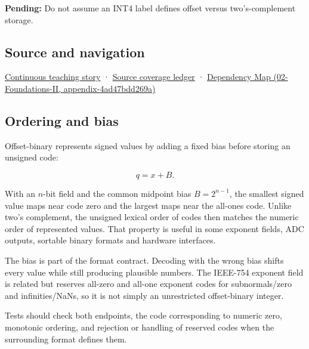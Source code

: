 \textbf{Pending:} Do not assume an INT4 label defines offset versus two's-complement storage.

\subsection{Source and navigation}\label{appendix-53a8cfb25f8d-source-and-navigation}

\hyperref[01-foundations-i-ch001-choosing-what-information-to-keep]{Continuous teaching story} · \hyperref[appendix-fd090d982a15]{Source coverage ledger} · \href{../02-Foundations-II/main.pdf\#nameddest=appendix-4ad47bdd269a}{Dependency Map (02-Foundations-II, appendix-4ad47bdd269a)}

\subsection{Ordering and bias}\label{appendix-53a8cfb25f8d-ordering-and-bias}

Offset-binary represents signed values by adding a fixed bias before storing an unsigned code:

\[q=x+B.\]

With an \(n\)-bit field and the common midpoint bias \(B=2^{n-1}\), the smallest signed value maps near code zero and the largest maps near the all-ones code. Unlike two's complement, the unsigned lexical order of codes then matches the numeric order of represented values. That property is useful in some exponent fields, ADC outputs, sortable binary formats and hardware interfaces.

The bias is part of the format contract. Decoding with the wrong bias shifts every value while still producing plausible numbers. The IEEE-754 exponent field is related but reserves all-zero and all-one exponent codes for subnormals/zero and infinities/NaNs, so it is not simply an unrestricted offset-binary integer.

Tests should check both endpoints, the code corresponding to numeric zero, monotonic ordering, and rejection or handling of reserved codes when the surrounding format defines them.
